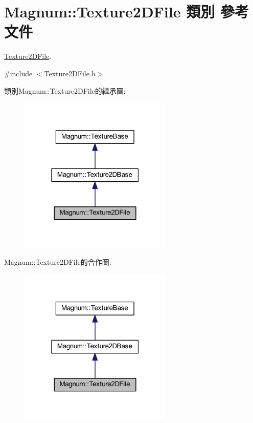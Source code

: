 \hypertarget{class_magnum_1_1_texture2_d_file}{}\section{Magnum\+:\+:Texture2\+D\+File 類別 參考文件}
\label{class_magnum_1_1_texture2_d_file}


\hyperlink{class_magnum_1_1_texture2_d_file}{Texture2\+D\+File}.  




{\ttfamily \#include $<$Texture2\+D\+File.\+h$>$}



類別\+Magnum\+:\+:Texture2\+D\+File的繼承圖\+:\nopagebreak
\begin{figure}[H]
\begin{center}
\leavevmode
\includegraphics[width=207pt]{class_magnum_1_1_texture2_d_file__inherit__graph}
\end{center}
\end{figure}


Magnum\+:\+:Texture2\+D\+File的合作圖\+:\nopagebreak
\begin{figure}[H]
\begin{center}
\leavevmode
\includegraphics[width=207pt]{class_magnum_1_1_texture2_d_file__coll__graph}
\end{center}
\end{figure}
